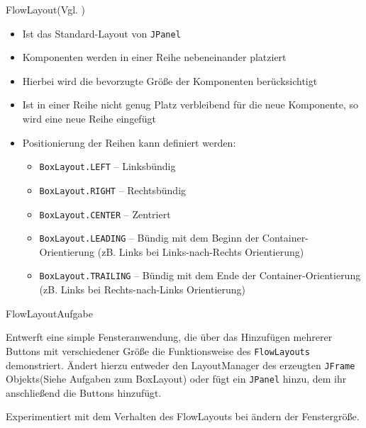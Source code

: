 \begin{frame}{FlowLayout}{(Vgl. \cite{orac:flowlayout})}
    \begin{itemize}
        \item Ist das Standard-Layout von \texttt{JPanel}
        \item Komponenten werden in einer Reihe nebeneinander platziert
        \item Hierbei wird die bevorzugte Größe der Komponenten berücksichtigt
        \item Ist in einer Reihe nicht genug Platz verbleibend für die neue Komponente, so wird eine neue Reihe eingefügt
        \item Positionierung der Reihen kann definiert werden:
        \begin{itemize}
            \item \texttt{BoxLayout.LEFT} -- Linksbündig
            \item \texttt{BoxLayout.RIGHT} -- Rechtsbündig
            \item \texttt{BoxLayout.CENTER} -- Zentriert
            \item \texttt{BoxLayout.LEADING} -- Bündig mit dem Beginn der Container-Orientierung (zB. Links bei Links-nach-Rechts Orientierung)
            \item \texttt{BoxLayout.TRAILING} -- Bündig mit dem Ende der Container-Orientierung (zB. Links bei Rechts-nach-Links Orientierung)
        \end{itemize}
    \end{itemize}
\end{frame}

\begin{frame}{FlowLayout}{Aufgabe}
\begin{alertblock}{}
Entwerft eine simple Fensteranwendung, die über das Hinzufügen mehrerer Buttons mit verschiedener Größe die Funktionsweise des \texttt{FlowLayouts} demonstriert. Ändert hierzu
entweder den LayoutManager des erzeugten \texttt{JFrame} Objekts(Siehe Aufgaben zum BoxLayout) oder fügt ein \texttt{JPanel} hinzu, dem ihr anschließend die Buttons hinzufügt.

Experimentiert mit dem Verhalten des FlowLayouts bei ändern der Fenstergröße.
\end{alertblock}
\end{frame}

